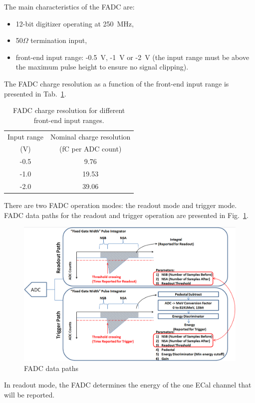 The main characteristics of the FADC are:
\begin{itemize}
\item 12-bit digitizer operating at 250~MHz, 
\item 50$\Omega$ termination input, 
\item front-end input range:  -0.5~V, -1~V or -2~V (the input range must be above the maximum pulse height to 
ensure no signal clipping).
\end{itemize}
The FADC charge resolution as a function of the front-end input range is presented in 
Tab.~\ref{tab:charge_resolution}.
\begin{table}[h]
\centering
\begin{tabular}{|c|c|}
\hline
Input range & Nominal charge resolution\\
(V) & (fC per ADC count)\\\hline
-0.5 & 9.76  \\\hline
-1.0 & 19.53  \\\hline
-2.0 & 39.06 \\\hline
\end{tabular}
\caption{FADC charge resolution for different front-end input ranges.}
\label{tab:charge_resolution}
\end{table}
There are two FADC operation modes: the readout mode and trigger mode.
FADC data paths for the readout and trigger operation are presented in Fig.~\ref{fig:hps_trigger_data}.
\begin{figure}[t]
\includegraphics[scale=0.4]{daq_trigger/figures/hps_trigger_data}
\caption{\small{FADC data paths}}
\label{fig:hps_trigger_data}
\end{figure}
In readout mode, the FADC determines the energy of the one ECal channel that will be reported. 
